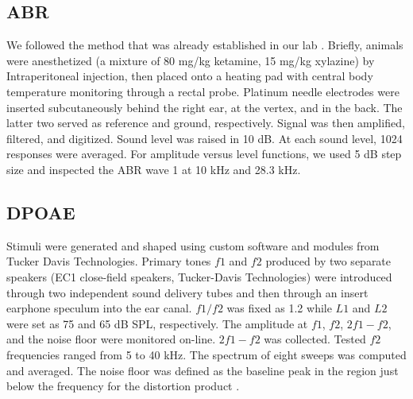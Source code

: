 \documentclass[11pt]{article}
\begin{document}
\subsection {ABR}
We followed the method that was already established in our lab \cite{Lei2011}. Briefly, animals were anesthetized (a mixture of 80 mg/kg ketamine, 15 mg/kg xylazine) by Intraperitoneal injection, then placed onto a heating pad with central body temperature monitoring through a rectal probe. Platinum needle electrodes were inserted subcutaneously behind the right ear, at the vertex, and in the back. The latter two served as reference and ground, respectively. Signal was then amplified, filtered, and digitized. Sound level was raised in 10 dB. At each sound level, 1024 responses were averaged. For amplitude versus level functions, we used 5 dB step size and inspected the ABR wave 1 at 10 kHz and 28.3 kHz.

\subsection {DPOAE}
Stimuli were generated and shaped using custom software and modules from Tucker Davis Technologies. Primary tones $f1$ and $f2$ produced by two separate speakers (EC1 close-field speakers, Tucker-Davis Technologies) were introduced through two independent sound delivery tubes and then through an insert earphone speculum into the ear canal. $f1/f2$ was fixed as 1.2 while $L1$ and $L2$ were set as 75 and 65 dB SPL, respectively. The amplitude at $f1$, $f2$, $2f1-f2$, and the noise floor were monitored on-line. $2f1-f2$ was collected. Tested $f2$ frequencies ranged from 5 to 40 kHz. The spectrum of eight sweeps was computed and averaged. The noise floor was defined as the baseline peak in the region just below the frequency for the distortion product \cite{Harding2002}.
\end{document}
